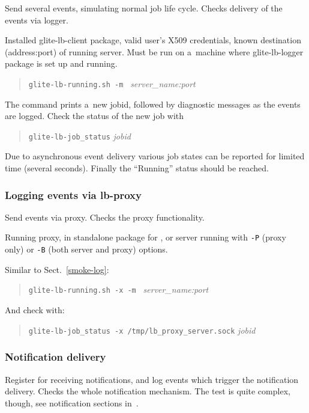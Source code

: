 \label{smoke-log}

Send several \LB events, simulating normal job life cycle.
Checks delivery of the events via \LB logger.

\req Installed glite-lb-client package, valid user's X509 credentials,
known destination (address:port) of running \LB server.
Must be run on a~machine where glite-lb-logger package is set up and running.\footnotemark[\theexamplesfootnote]

\how
\begin{quote}
\verb'glite-lb-running.sh -m ' \emph{server\_name:port}
\end{quote}

The command prints a~new jobid, followed by diagnostic messages as the events are logged. 
Check the status of the new job with
\begin{quote}
\verb'glite-lb-job_status' \emph{jobid}
\end{quote}

\result
Due to asynchronous event
delivery various job states can be reported for limited time (several seconds).
Finally the
``Running'' status should be reached.

\subsubsection{Logging events via lb-proxy}

Send events via \LB proxy. Checks the proxy functionality.

\req Running \LB proxy, in standalone package for , or
\LB server running with \verb'-P' (proxy only) or \verb'-B' (both server and proxy)
options.\footnotemark[\theexamplesfootnote]

\how Similar to Sect.~\ref{smoke-log}:
\begin{quote}
\verb'glite-lb-running.sh -x -m ' \emph{server\_name:port}
\end{quote}

And check with:
\begin{quote}
\verb'glite-lb-job_status -x /tmp/lb_proxy_server.sock' \emph{jobid}
\end{quote}


\subsubsection{Notification delivery}

Register for receiving notifications, and log events which trigger
the notification delivery. Checks the whole notification mechanism.
The test is quite complex, though, see notification sections in~\cite{lbug,lbtp}.
